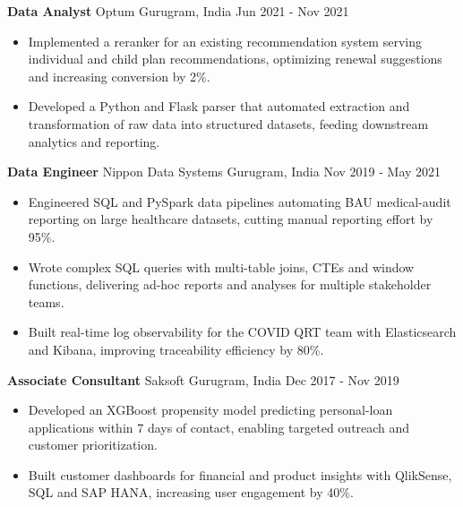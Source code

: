\documentclass[10pt,a4paper]{article}
\newcommand{\role}[4]{\textbf{#1} \textbar{} #2 \hfill #3 \textbar{} #4\par}
\begin{document}
\vspace{3pt}
\role{Data Analyst}{Optum}{Gurugram, India}{Jun 2021 - Nov 2021}
\begin{itemize}
  \item Implemented a reranker for an existing recommendation system serving individual and child plan recommendations, optimizing renewal suggestions and increasing conversion by 2\%.
  \item Developed a Python and Flask parser that automated extraction and transformation of raw data into structured datasets, feeding downstream analytics and reporting.
\end{itemize}
\vspace{3pt}
\role{Data Engineer}{Nippon Data Systems}{Gurugram, India}{Nov 2019 - May 2021}
\begin{itemize}
  \item Engineered SQL and PySpark data pipelines automating BAU medical-audit reporting on large healthcare datasets, cutting manual reporting effort by 95\%.
  \item Wrote complex SQL queries with multi-table joins, CTEs and window functions, delivering ad-hoc reports and analyses for multiple stakeholder teams.
  \item Built real-time log observability for the COVID QRT team with Elasticsearch and Kibana, improving traceability efficiency by 80\%.
\end{itemize}
\vspace{3pt}
\role{Associate Consultant}{Saksoft}{Gurugram, India}{Dec 2017 - Nov 2019}
\begin{itemize}
  \item Developed an XGBoost propensity model predicting personal-loan applications within 7 days of contact, enabling targeted outreach and customer prioritization.
  \item Built customer dashboards for financial and product insights with QlikSense, SQL and SAP HANA, increasing user engagement by 40\%.
\end{itemize}
\end{document}
